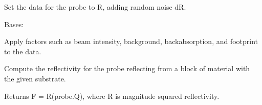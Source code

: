 \documentclass[letterpaper,10pt,english]{sphinxmanual}
\begin{document}
\begin{fulllineitems}
\begin{fulllineitems}
\end{fulllineitems}


\begin{fulllineitems}
\label{api/probe:refl1d.probe.PolarizedNeutronProbe.simulate_data}
Set the data for the probe to R, adding random noise dR.

\end{fulllineitems}


\end{fulllineitems}


\begin{fulllineitems}
\label{api/probe:refl1d.probe.PolarizedNeutronQProbe}
Bases: {\hyperref[api/probe:refl1d.probe.PolarizedNeutronProbe]{}}

\begin{fulllineitems}
\label{api/probe:refl1d.probe.PolarizedNeutronQProbe.apply_beam}
Apply factors such as beam intensity, background, backabsorption,
and footprint to the data.

\end{fulllineitems}


\begin{fulllineitems}
\label{api/probe:refl1d.probe.PolarizedNeutronQProbe.calc_Q}
\end{fulllineitems}


\begin{fulllineitems}
\label{api/probe:refl1d.probe.PolarizedNeutronQProbe.fresnel}
Compute the reflectivity for the probe reflecting from a block of
material with the given substrate.

Returns F = R(probe.Q), where R is magnitude squared reflectivity.


\end{fulllineitems}
\end{fulllineitems}
\end{document}
